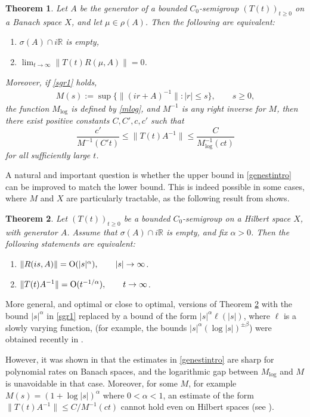 \documentclass[11pt]{amsart}
\newtheorem{theorem}{Theorem}[section]
\theoremstyle{definition}
\theoremstyle{remark}
\numberwithin{equation}{section}
\begin{document}
\begin{theorem}\label{semigrouprates} Let $A$ be the generator of a bounded $C_0$-semigroup $(T(t))_{t \ge 0}$ on a Banach space $X$, and let $\mu \in \rho(A)$. Then the following are equivalent:
\begin{enumerate}[\rm(i)]
\item $\sigma(A)\cap i\mathbb R$ is empty,  \label{sgr1}
\item $\lim_{t \to \infty} \|T(t)R(\mu,A)\|=0$.
 \end{enumerate}
Moreover, if \eqref{sgr1} holds,
\begin{eqnarray*}
M(s) := \sup \{\|(ir+A)^{-1}\| : |r| \le s\}, \qquad s\ge 0,
\end{eqnarray*}
the function $M_{\log}$ is defined by \eqref{mlog}, and $M^{-1}$ is any right inverse for $M$, then there exist positive constants $C,C',c,c'$ such that
\begin{equation} \label{genestintro}
\frac{c'} {M^{-1}(C't)} \le \|T(t)A^{-1}\| \le \frac{C}
{M_{\log}^{-1}(ct)}
\end{equation}
for all sufficiently large $t$.
\end{theorem}

A natural and important question is whether the upper bound in \eqref{genestintro} can be improved to match the lower bound.
This is indeed possible in some cases, where $M$ and $X$ are particularly tractable, as the following result from \cite{BoTo10} shows.

\begin{theorem}\label{borto}
Let $(T(t))_{t \ge 0}$ be a bounded $C_0$-semigroup on a Hilbert space
$X$, with generator $A$.  Assume that $\sigma(A)\cap i\mathbb R$
is empty, and fix  $\alpha >0$.  Then the following statements
are equivalent:
\begin{enumerate}[\rm(i)]
\item   $\|R(is,A)\|= {\rm O}(|s|^\alpha), \qquad |s| \to \infty$.
\item  $\|T(t)A^{-1}\|= {\rm O}(t^{-1/\alpha}), \qquad t \to \infty$.
\end{enumerate}
\end{theorem}
More general, and optimal or close to optimal, versions of Theorem \ref{borto} with the bound $|s|^\alpha$ in \eqref{sgr1} replaced by a bound of the form $|s|^\alpha \ell(|s|)$, where $\ell$ is a slowly varying function,
(for example, the bounds $|s|^\alpha (\log|s|)^{\pm \beta}$) were obtained recently in \cite{BaChTo13}.

However, it was shown in \cite{BoTo10} that the estimates in \eqref{genestintro} are sharp for polynomial rates on Banach spaces, and the logarithmic gap between $M_{\log}$ and $M$ is unavoidable in that case. Moreover, for some $M$, for example $M(s)=(1+\log|s|)^\alpha$ where $0<\alpha<1$, an estimate of the form $\|T(t)A^{-1}\|\le C/M^{-1}(ct)$ cannot hold even on Hilbert spaces (see \cite[Proposition 5.1]{BaChTo13}).
\end{document}
